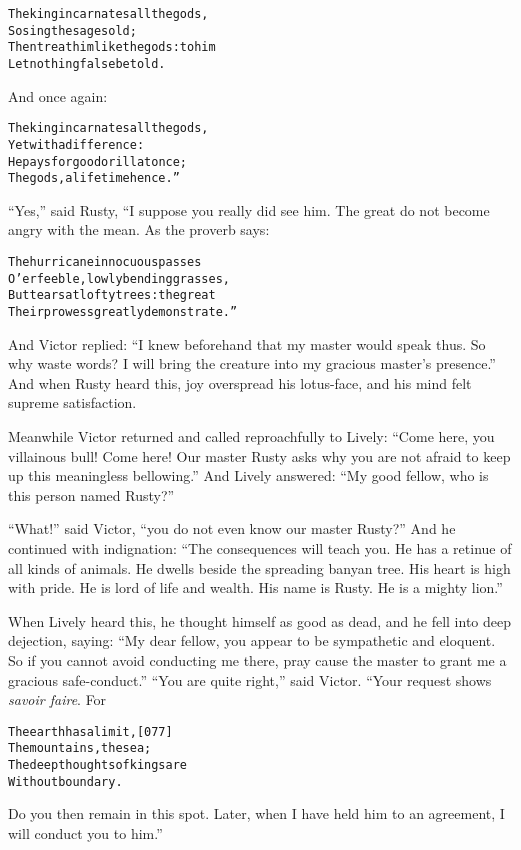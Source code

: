 \documentclass{article}
\renewenvironment{verbatim}{\begin{alltt}\normalfont\begin{centering}}{\end{centering}\end{alltt}}
\begin{document}
\begin{verbatim}
The king incarnates all the gods,
    So sing the sages old;
Then treat him like the gods: to him
    Let nothing false be told.
\end{verbatim}
And once again:

\begin{verbatim}
The king incarnates all the gods,
    Yet with a difference:
He pays for good or ill at once;
    The gods, a lifetime hence.”
\end{verbatim}
``Yes,'' said Rusty, “I suppose you really did see him. The great
do not become angry with the mean. As the proverb says:

\begin{verbatim}
The hurricane innocuous passes
O'er feeble, lowly bending grasses,
But tears at lofty trees: the great
Their prowess greatly demonstrate.”
\end{verbatim}
And Victor replied:
``I knew beforehand that my master would speak thus. So why waste words? I will bring the creature into my gracious master's presence.''
And when Rusty heard this, joy overspread his lotus-face, and his
mind felt supreme satisfaction.

Meanwhile Victor returned and called reproachfully to Lively:
``Come here, you villainous bull! Come here! Our master Rusty asks why you are not afraid to keep up this meaningless bellowing.''
And Lively answered:
``My good fellow, who is this person named Rusty?''

``What!'' said Victor, ``you do not even know our master Rusty?''
And he continued with indignation:
``The consequences will teach you. He has a retinue of all kinds of animals. He dwells beside the spreading banyan tree. His heart is high with pride. He is lord of life and wealth. His name is Rusty. He is a mighty lion.''

When Lively heard this, he thought himself as good as dead, and he
fell into deep dejection, saying:
``My dear fellow, you appear to be sympathetic and eloquent. So if you cannot avoid conducting me there, pray cause the master to grant me a gracious safe-conduct.''
``You are quite right,'' said Victor. “Your request shows
\emph{savoir faire}. For

\begin{verbatim}
The earth has a limit,                                  [077]
    The mountains, the sea;
The deep thoughts of kings are
    Without boundary.
\end{verbatim}
Do you then remain in this spot. Later, when I have held him to an
agreement, I will conduct you to him.”
\end{document}
